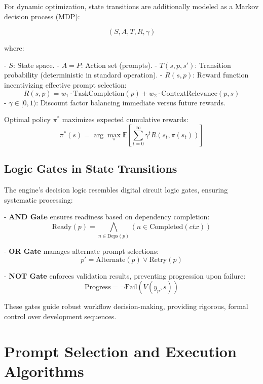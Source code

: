\documentclass[11pt,a4paper]{article}
\begin{document}
For dynamic optimization, state transitions are additionally modeled as a Markov decision process (MDP):

\[
(S, A, T, R, \gamma)
\]

where:

- \( S \): State space.
- \( A = P \): Action set (prompts).
- \( T(s, p, s') \): Transition probability (deterministic in standard operation).
- \( R(s, p) \): Reward function incentivizing effective prompt selection:
\[
R(s, p) = w_1 \cdot \text{TaskCompletion}(p) + w_2 \cdot \text{ContextRelevance}(p, s)
\]
- \( \gamma \in [0, 1) \): Discount factor balancing immediate versus future rewards.

Optimal policy \( \pi^* \) maximizes expected cumulative rewards:
\[
\pi^*(s) = \arg\max_{\pi} \mathbb{E}\left[\sum_{t=0}^{\infty} \gamma^t R(s_t, \pi(s_t))\right]
\]

\subsection{Logic Gates in State Transitions}
\label{subsec:logic_gates}

The engine's decision logic resembles digital circuit logic gates, ensuring systematic processing:

- \textbf{AND Gate} ensures readiness based on dependency completion:
\[
\text{Ready}(p) = \bigwedge_{n \in \text{Deps}(p)}(n \in \text{Completed}(ctx))
\]

- \textbf{OR Gate} manages alternate prompt selections:
\[
p' = \text{Alternate}(p) \lor \text{Retry}(p)
\]

- \textbf{NOT Gate} enforces validation results, preventing progression upon failure:
\[
\text{Progress} = \neg\text{Fail}(V(y_p, s))
\]

These gates guide robust workflow decision-making, providing rigorous, formal control over development sequences.

\section{Prompt Selection and Execution Algorithms}
\label{sec:prompt_selection}
\end{document}
